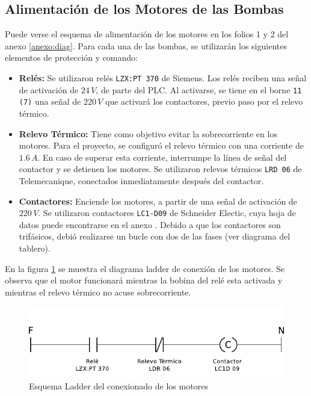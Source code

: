 \subsection{Alimentación de los Motores de las Bombas}
\label{subsec:alimentacionMotores}
Puede verse el esquema de alimentación de los motores en los folios 1 y 2 del 
anexo \ref{anexo:diag}. Para cada una de las bombas, se utilizarán los 
siguientes elementos de 
protección y comando:
\begin{itemize}
 \item \textbf{Relés:} 
 Se utilizaron relés \verb|LZX:PT 370| de Siemens. Los relés reciben una señal 
de activación de $24\,V$, de parte del PLC. Al activarse, se tiene en el borne 
\verb|11 (7)| una señal de $220\,V$ que activará los
 contactores, previo paso por el relevo térmico. 
 \item \textbf{Relevo Térmico:} Tiene como objetivo evitar la sobrecorriente en
 los motores. Para el proyecto, se configuró el relevo térmico con una corriente
 de $1.6\,A$. En caso de superar esta corriente, interrumpe la línea de señal
 del contactor y se detienen los motores. Se utilizaron relevos térmicos 
 \verb|LRD 06| de Telemecanique, conectados inmediatamente después del 
contactor.
 \item \textbf{Contactores:} Enciende los motores, a partir de una señal de 
activación de  
 $220\,V$. Se utilizaron 
contactores \verb|LC1-D09| de Schneider Electic, cuya hoja de datos 
puede encontrarse en el anexo . Debido a que los 
contactores
 son trifásicos, debió realizarse un bucle con dos de las fases (ver diagrama 
del tablero).
\end{itemize}

En la figura \ref{fig:diagramaLadderContactor} se muestra el diagrama ladder de 
conexión de los motores. Se observa que  el motor funcionará mientras la bobina
del relé esta activada y mientras el relevo térmico no acuse sobrecorriente.

\begin{figure}
 \centering
 \includegraphics[scale=1.1]{Cap3-TableroElectrico/Images/ladderConexion.pdf}
 \caption{Esquema Ladder del conexionado de los motores}
 \label{fig:diagramaLadderContactor}
\end{figure}

